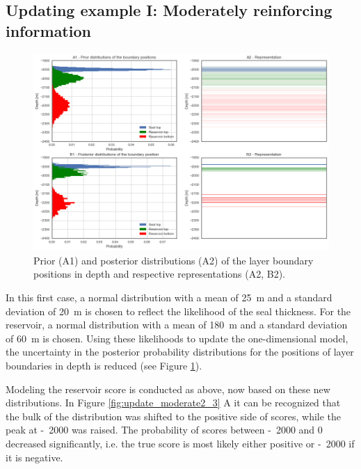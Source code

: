 	\subsection{Updating example I: Moderately reinforcing information}
	
	\begin{figure}[h]
		\centering
		\includegraphics[width=1\textwidth]{Figures/update_moderate1.png}
		\caption{Prior (A1) and posterior distributions (A2) of the layer boundary positions in depth and respective representations (A2, B2).}\label{fig:update_moderate1} 
	\end{figure}
	
	In this first case, a normal distribution with a mean of 25~m and a standard deviation of 20~m is chosen to reflect the likelihood of the seal thickness. For the reservoir, a normal distribution with a mean of 180~m and a standard deviation of 60~m is chosen. Using these likelihoods to update the one-dimensional model, the uncertainty in the posterior probability distributions for the positions of layer boundaries in depth is reduced (see Figure \ref{fig:update_moderate1}).
		
	Modeling the reservoir score is conducted as above, now based on these new distributions. In Figure \ref{fig:update_moderate2_3} A it can be recognized that the bulk of the distribution was shifted to the positive side of scores, while the peak at -~2000 was raised. The probability of scores between -~2000 and 0 decreased significantly, i.e. the true score is most likely either positive or -~2000 if it is negative.	
	
